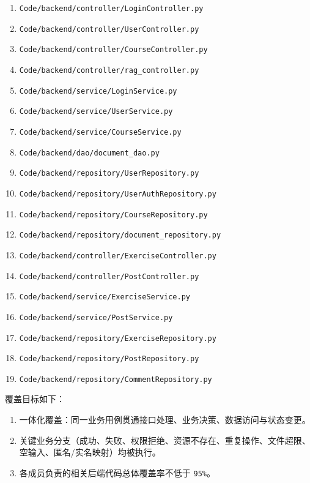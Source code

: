 \documentclass[12pt,a4paper]{ctexart}
\begin{document}
\begin{enumerate}
  \item \texttt{Code/backend/controller/LoginController.py}
  \item \texttt{Code/backend/controller/UserController.py}
  \item \texttt{Code/backend/controller/CourseController.py}
  \item \texttt{Code/backend/controller/rag\_controller.py}
  \item \texttt{Code/backend/service/LoginService.py}
  \item \texttt{Code/backend/service/UserService.py}
  \item \texttt{Code/backend/service/CourseService.py}
  \item \texttt{Code/backend/dao/document\_dao.py}
  \item \texttt{Code/backend/repository/UserRepository.py}
  \item \texttt{Code/backend/repository/UserAuthRepository.py}
  \item \texttt{Code/backend/repository/CourseRepository.py}
  \item \texttt{Code/backend/repository/document\_repository.py}
  \item \texttt{Code/backend/controller/ExerciseController.py}
  \item \texttt{Code/backend/controller/PostController.py}
  \item \texttt{Code/backend/service/ExerciseService.py}
  \item \texttt{Code/backend/service/PostService.py}
  \item \texttt{Code/backend/repository/ExerciseRepository.py}
  \item \texttt{Code/backend/repository/PostRepository.py}
  \item \texttt{Code/backend/repository/CommentRepository.py}
\end{enumerate}

覆盖目标如下：

\begin{enumerate}
  \item 一体化覆盖：同一业务用例贯通接口处理、业务决策、数据访问与状态变更。
  \item 关键业务分支（成功、失败、权限拒绝、资源不存在、重复操作、文件超限、空输入、匿名/实名映射）均被执行。
  \item 各成员负责的相关后端代码总体覆盖率不低于 \texttt{95\%}。
\end{enumerate}
\end{document}
